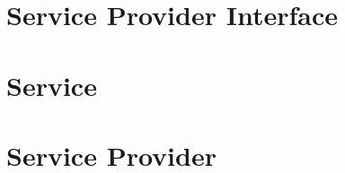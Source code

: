 \documentclass[a4paper,10pt]{report}
\begin{document}



\clearpage
\tableofcontents
\clearpage

\part{Service Provider Interface}\label{vol:spi}


\part{Service}\label{vol:srv}



%


\part{Service Provider}\label{vol:sp}



\clearpage
\listoffigures
\listoftables

\ifesource
\lstlistoflistings
\else
\listoflistings
\fi

\printindex
\end{document}
